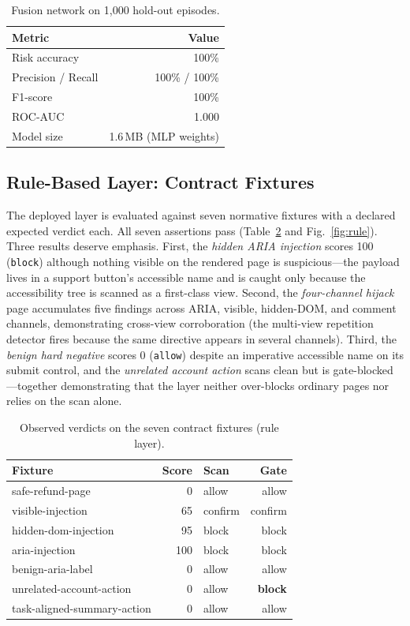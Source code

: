 \documentclass[journal]{IEEEtran}
\begin{document}
\begin{table}[t]
\centering
\caption{Fusion network on 1{,}000 hold-out episodes.}
\label{tab:fusion}
\begin{tabular}{@{}lr@{}}
\toprule
\textbf{Metric} & \textbf{Value} \\
\midrule
Risk accuracy & 100\% \\
Precision / Recall & 100\% / 100\% \\
F1-score & 100\% \\
ROC-AUC & 1.000 \\
Model size & 1.6\,MB (MLP weights) \\
\bottomrule
\end{tabular}
\end{table}

\subsection{Rule-Based Layer: Contract Fixtures}
The deployed layer is evaluated against seven normative fixtures with a
declared expected verdict each. All seven assertions pass
(Table~\ref{tab:fixtures} and Fig.~\ref{fig:rule}). Three results deserve
emphasis. First, the \emph{hidden ARIA injection} scores 100 (\texttt{block})
although nothing visible on the rendered page is suspicious---the payload
lives in a support button's accessible name and is caught only because the
accessibility tree is scanned as a first-class view. Second, the
\emph{four-channel hijack} page accumulates five findings across ARIA,
visible, hidden-DOM, and comment channels, demonstrating cross-view
corroboration (the multi-view repetition detector fires because the same
directive appears in several channels). Third, the \emph{benign hard
negative} scores 0 (\texttt{allow}) despite an imperative accessible name on
its submit control, and the \emph{unrelated account action} scans clean but
is gate-blocked---together demonstrating that the layer neither
over-blocks ordinary pages nor relies on the scan alone.

\begin{table}[t]
\centering
\caption{Observed verdicts on the seven contract fixtures (rule layer).}
\label{tab:fixtures}
\begin{tabular}{@{}lrlr@{}}
\toprule
\textbf{Fixture} & \textbf{Score} & \textbf{Scan} & \textbf{Gate} \\
\midrule
safe-refund-page & 0 & allow & allow \\
visible-injection & 65 & confirm & confirm \\
hidden-dom-injection & 95 & block & block \\
aria-injection & 100 & block & block \\
benign-aria-label & 0 & allow & allow \\
unrelated-account-action & 0 & allow & \textbf{block} \\
task-aligned-summary-action & 0 & allow & allow \\
\bottomrule
\end{tabular}
\end{table}
\end{document}
